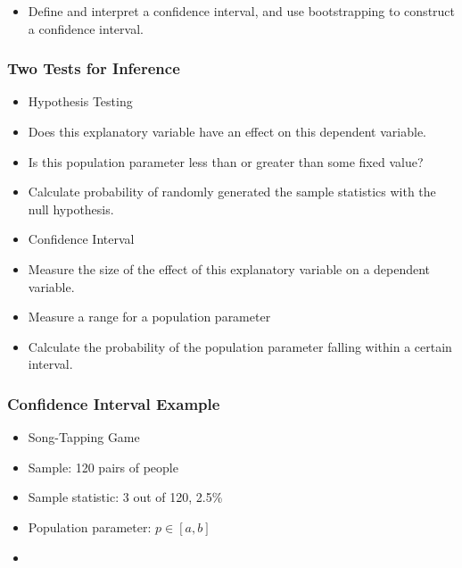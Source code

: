 \documentclass{beamer}
\begin{document}
\begin{frame}
  \begin{itemize}
    \item[] 
      Define and interpret a confidence interval, and use
      bootstrapping to construct a confidence interval.
  \end{itemize}
\end{frame}

\begin{frame}
  \frametitle{Two Tests for Inference}
  \begin{itemize}
    \item[] 
      Hypothesis Testing
      \vspace{0.5cm}
    \item[] 
      Does this explanatory variable have an effect on this dependent
      variable.
      \vspace{0.5cm}
    \item[] 
      Is this population parameter less than or greater than some
      fixed value?
      \vspace{0.5cm}
    \item[] 
      Calculate probability of randomly generated the sample
      statistics with the null hypothesis.
      \vspace{0.5cm}
    \item[] 
      Confidence Interval
      \vspace{0.5cm}
    \item[] 
      Measure the size of the effect of this explanatory variable on a
      dependent variable.
      \vspace{0.5cm}
    \item[] 
      Measure a range for a population parameter 
      \vspace{0.5cm}
    \item[] 
      Calculate the probability of the population parameter falling
      within a certain interval. 
  \end{itemize}
\end{frame}

\begin{frame}
  \frametitle{Confidence Interval Example}
  \begin{itemize}
    \item[] 
      Song-Tapping Game
      \vspace{0.5cm}
    \item[] 
      Sample: 120 pairs of people
      \vspace{0.5cm}
    \item[] 
      Sample statistic: 3 out of 120, 2.5\%
      \vspace{0.5cm}
    \item[] 
      Population parameter: $p \in [a,b]$
    \item[] 
  \end{itemize}
\end{frame}
\end{document}
